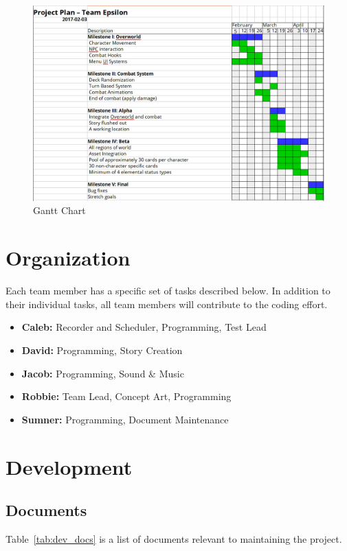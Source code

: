 \documentclass[12pt,titlepage]{article}
\begin{document}
\begin{figure}[H]
    \caption{Gantt Chart}
    \label{fig:gantt}
    \centering
    \includegraphics[width=\textwidth]{gantt-chart}
\end{figure}

\section{Organization}
\label{sec:org}
Each team member has a specific set of tasks described below. In addition to
their individual tasks, all team members will contribute to the coding effort.
\begin{itemize}
    \item \textbf{Caleb:} Recorder and Scheduler, Programming, Test Lead
    \item \textbf{David:} Programming, Story Creation
    \item \textbf{Jacob:} Programming, Sound \& Music
    \item \textbf{Robbie:} Team Lead, Concept Art, Programming
    \item \textbf{Sumner:} Programming, Document Maintenance
\end{itemize}

\section{Development}
\label{sec:dev}

\subsection{Documents}

Table~\ref{tab:dev_docs} is a list of documents relevant to maintaining the project.
\end{document}
